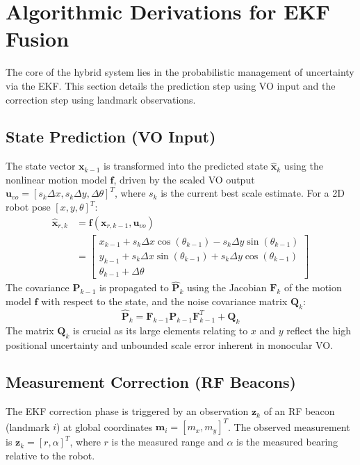 \documentclass[conference]{IEEEtran}
\begin{document}
\section{Algorithmic Derivations for EKF Fusion}

The core of the hybrid system lies in the probabilistic management of uncertainty via the EKF. This section details the prediction step using VO input and the correction step using landmark observations.

\subsection{State Prediction (VO Input)}
The state vector $\mathbf{x}_{k-1}$ is transformed into the predicted state $\mathbf{\hat{x}}_k$ using the nonlinear motion model $\mathbf{f}$, driven by the scaled VO output $\mathbf{u}_{vo} = [s_k \Delta x, s_k \Delta y, \Delta \theta]^T$, where $s_k$ is the current best scale estimate. For a 2D robot pose $[x, y, \theta]^T$:
\begin{align*}
    \mathbf{\hat{x}}_{r,k} &= \mathbf{f}(\mathbf{x}_{r,k-1}, \mathbf{u}_{vo}) \\
    &= \begin{bmatrix}
        x_{k-1} + s_k \Delta x \cos(\theta_{k-1}) - s_k \Delta y \sin(\theta_{k-1}) \\
        y_{k-1} + s_k \Delta x \sin(\theta_{k-1}) + s_k \Delta y \cos(\theta_{k-1}) \\
        \theta_{k-1} + \Delta \theta
    \end{bmatrix}
\end{align*}
The covariance $\mathbf{P}_{k-1}$ is propagated to $\mathbf{\hat{P}}_k$ using the Jacobian $\mathbf{F}_k$ of the motion model $\mathbf{f}$ with respect to the state, and the noise covariance matrix $\mathbf{Q}_k$:
$$
\mathbf{\hat{P}}_k = \mathbf{F}_{k-1} \mathbf{P}_{k-1} \mathbf{F}_{k-1}^T + \mathbf{Q}_k
$$
The matrix $\mathbf{Q}_k$ is crucial as its large elements relating to $x$ and $y$ reflect the high positional uncertainty and unbounded scale error inherent in monocular VO.

\subsection{Measurement Correction (RF Beacons)}
The EKF correction phase is triggered by an observation $\mathbf{z}_k$ of an RF beacon (landmark $i$) at global coordinates $\mathbf{m}_i = [m_x, m_y]^T$. The observed measurement is $\mathbf{z}_k = [r, \alpha]^T$, where $r$ is the measured range and $\alpha$ is the measured bearing relative to the robot.
\end{document}
